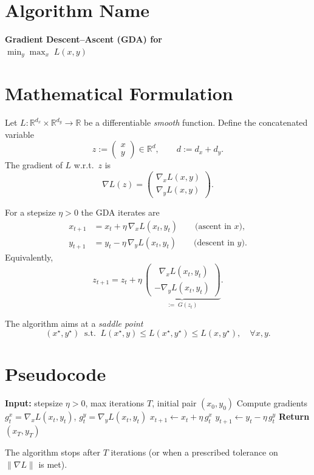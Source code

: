 \documentclass{article}
\begin{document}
\section*{Algorithm Name}
\textbf{Gradient Descent–Ascent (GDA) for \\ $\displaystyle\min_{y}\max_{x}\;L(x,y)$}

\section*{Mathematical Formulation}
Let $L:\mathbb{R}^{d_x}\times\mathbb{R}^{d_y}\rightarrow\mathbb{R}$ be a differentiable
\emph{smooth} function.  Define the concatenated variable 
\[
z:=\begin{pmatrix}x\\y\end{pmatrix}\in\mathbb{R}^{d},\qquad d:=d_x+d_y .
\]
The gradient of $L$ w.r.t.\ $z$ is
\[
\nabla L(z)=\begin{pmatrix}\nabla_x L(x,y)\\ \nabla_y L(x,y)\end{pmatrix}.
\]

For a stepsize $\eta>0$ the GDA iterates are
\begin{align}
x_{t+1} &= x_{t}+ \eta\,\nabla_x L(x_t,y_t) \qquad\text{(ascent in $x$)},\label{eq:x-update}\\
y_{t+1} &= y_{t}- \eta\,\nabla_y L(x_t,y_t) \qquad\text{(descent in $y$)}.\label{eq:y-update}
\end{align}
Equivalently,
\[
z_{t+1}=z_t+\eta\,\underbrace{\begin{pmatrix}
\;\;\nabla_x L(x_t,y_t)\\[2mm]
-\nabla_y L(x_t,y_t)
\end{pmatrix}}_{:=\;G(z_t)} .
\]

The algorithm aims at a \emph{saddle point}
\[
(x^\star,y^\star)\;\; \text{s.t.}\;\;
L(x^\star,y)\le L(x^\star,y^\star)\le L(x,y^\star),\quad\forall x,y .
\]

\section*{Pseudocode}
\begin{algorithm}[H]
\caption{Gradient Descent–Ascent (GDA)}
\begin{algorithmic}[1]
\State \textbf{Input:} stepsize $\eta>0$, max iterations $T$, initial pair $(x_0,y_0)$
    \State Compute gradients $g^x_t=\nabla_x L(x_t,y_t)$,
                     $g^y_t=\nabla_y L(x_t,y_t)$
    \State $x_{t+1}\gets x_t+\eta\,g^x_t$ 
    \State $y_{t+1}\gets y_t-\eta\,g^y_t$ 
\EndFor
\State \textbf{Return} $(x_T,y_T)$
\end{algorithmic}
\end{algorithm}
The algorithm stops after $T$ iterations (or when a prescribed tolerance on $\|\nabla L\|$ is met).
\end{document}
